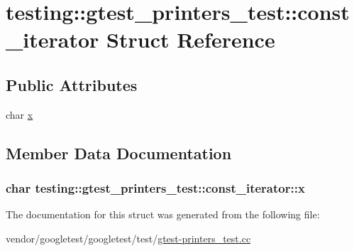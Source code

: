\hypertarget{structtesting_1_1gtest__printers__test_1_1const__iterator}{}\section{testing\+:\+:gtest\+\_\+printers\+\_\+test\+:\+:const\+\_\+iterator Struct Reference}
\label{structtesting_1_1gtest__printers__test_1_1const__iterator}
\subsection*{Public Attributes}
\begin{DoxyCompactItemize}
\item 
char \hyperlink{structtesting_1_1gtest__printers__test_1_1const__iterator_a4412dbc1c37c2bc5211971f0c8176d6b}{x}
\end{DoxyCompactItemize}


\subsection{Member Data Documentation}
\subsubsection[{\texorpdfstring{x}{x}}]{\setlength{\rightskip}{0pt plus 5cm}char testing\+::gtest\+\_\+printers\+\_\+test\+::const\+\_\+iterator\+::x}\hypertarget{structtesting_1_1gtest__printers__test_1_1const__iterator_a4412dbc1c37c2bc5211971f0c8176d6b}{}\label{structtesting_1_1gtest__printers__test_1_1const__iterator_a4412dbc1c37c2bc5211971f0c8176d6b}


The documentation for this struct was generated from the following file\+:\begin{DoxyCompactItemize}
\item 
vendor/googletest/googletest/test/\hyperlink{gtest-printers__test_8cc}{gtest-\/printers\+\_\+test.\+cc}\end{DoxyCompactItemize}
